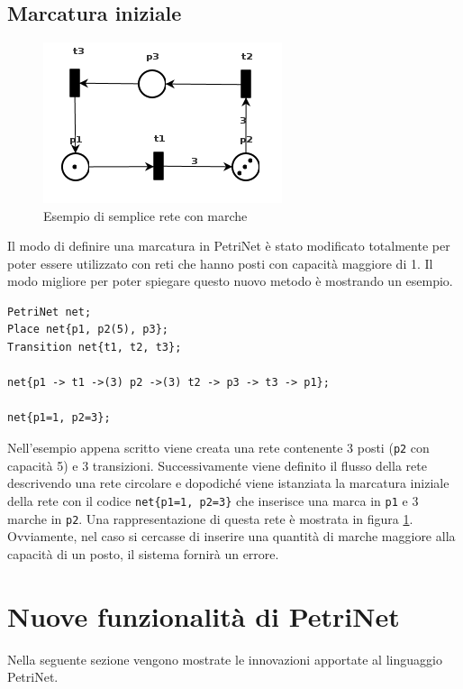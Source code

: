 \documentclass[italian,12pt]{book}
\begin{document}
\subsection{Marcatura iniziale}
\begin{figure}[htb]
\centerline{\includegraphics[width=7cm]{img/test_marcature.png}}
\caption{Esempio di semplice rete con marche}\label{fig:test_marcature.png}
\end{figure}
Il modo di definire una marcatura in PetriNet è stato modificato totalmente per poter essere utilizzato con reti che hanno posti con capacità maggiore di 1.
Il modo migliore per poter spiegare questo nuovo metodo è mostrando un esempio.
\begin{verbatim}PetriNet net;
Place net{p1, p2(5), p3};
Transition net{t1, t2, t3};

net{p1 -> t1 ->(3) p2 ->(3) t2 -> p3 -> t3 -> p1};

net{p1=1, p2=3};
\end{verbatim}

Nell'esempio appena scritto viene creata una rete contenente 3 posti ({\tt p2} con capacità 5) e 3 transizioni. 
Successivamente viene definito il flusso della rete descrivendo una rete circolare e dopodiché viene istanziata la marcatura iniziale della rete con il codice {\tt net\{p1=1, p2=3\}}
 che inserisce una marca in {\tt p1} e 3 marche in {\tt p2}. Una rappresentazione di questa rete è mostrata in figura \ref{fig:test_marcature.png}.\\
Ovviamente, nel caso si cercasse di inserire una quantità di marche maggiore alla capacità di un posto, il sistema fornirà un errore.

\section{Nuove funzionalità di PetriNet}
Nella seguente sezione vengono mostrate le innovazioni apportate al linguaggio PetriNet.
\end{document}
